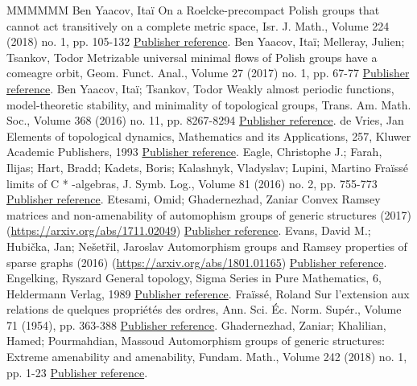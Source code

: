 \documentclass[11pt]{article}
\theoremstyle{definition}
\numberwithin{equation}{section}
\numberwithin{figure}{section}
\numberwithin{table}{section}
\begin{document}
\begin{thebibliography}{MMMMMM}
 Ben Yaacov, Itaï On a Roelcke-precompact Polish groups that cannot act transitively on a complete metric space, Isr. J. Math., Volume 224 (2018) no. 1, pp. 105-132 \href{https://ahl.centre-mersenne.org/item/AHL_2019__2__149_0/#BY}{Publisher reference}.
 Ben Yaacov, Itaï; Melleray, Julien; Tsankov, Todor Metrizable universal minimal flows of Polish groups have a comeagre orbit, Geom. Funct. Anal., Volume 27 (2017) no. 1, pp. 67-77 \href{https://ahl.centre-mersenne.org/item/AHL_2019__2__149_0/#BYMT}{Publisher reference}.
 Ben Yaacov, Itaï; Tsankov, Todor Weakly almost periodic functions, model-theoretic stability, and minimality of topological groups, Trans. Am. Math. Soc., Volume 368 (2016) no. 11, pp. 8267-8294 \href{https://ahl.centre-mersenne.org/item/AHL_2019__2__149_0/#BYT}{Publisher reference}.
 de Vries, Jan Elements of topological dynamics, Mathematics and its Applications, 257, Kluwer Academic Publishers, 1993 \href{https://ahl.centre-mersenne.org/item/AHL_2019__2__149_0/#dV}{Publisher reference}.
 Eagle, Christophe J.; Farah, Ilijas; Hart, Bradd; Kadets, Boris; Kalashnyk, Vladyslav; Lupini, Martino Fraïssé limits of C * -algebras, J. Symb. Log., Volume 81 (2016) no. 2, pp. 755-773 \href{https://ahl.centre-mersenne.org/item/AHL_2019__2__149_0/#EFHKKL}{Publisher reference}.
 Etesami, Omid; Ghadernezhad, Zaniar Convex Ramsey matrices and non-amenability of automophism groups of generic structures (2017) (\url{https://arxiv.org/abs/1711.02049}) \href{https://ahl.centre-mersenne.org/item/AHL_2019__2__149_0/#EG}{Publisher reference}.
 Evans, David M.; Hubička, Jan; Nešetřil, Jaroslav Automorphism groups and Ramsey properties of sparse graphs (2016) (\url{https://arxiv.org/abs/1801.01165}) \href{https://ahl.centre-mersenne.org/item/AHL_2019__2__149_0/#EHN}{Publisher reference}.
 Engelking, Ryszard General topology, Sigma Series in Pure Mathematics, 6, Heldermann Verlag, 1989 \href{https://ahl.centre-mersenne.org/item/AHL_2019__2__149_0/#Eng}{Publisher reference}.
 Fraïssé, Roland Sur l’extension aux relations de quelques propriétés des ordres, Ann. Sci. Éc. Norm. Supér., Volume 71 (1954), pp. 363-388 \href{https://ahl.centre-mersenne.org/item/AHL_2019__2__149_0/#Fr0}{Publisher reference}.
 Ghadernezhad, Zaniar; Khalilian, Hamed; Pourmahdian, Massoud Automorphism groups of generic structures: Extreme amenability and amenability, Fundam. Math., Volume 242 (2018) no. 1, pp. 1-23 \href{https://ahl.centre-mersenne.org/item/AHL_2019__2__149_0/#GKP}{Publisher reference}.

\end{thebibliography}
\end{document}

